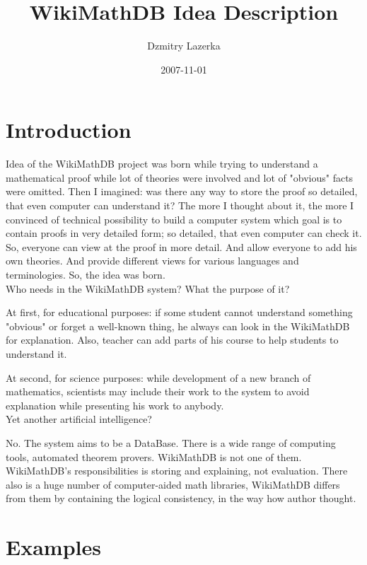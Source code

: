\documentclass{article}
\title {WikiMathDB Idea Description}
\author{Dzmitry Lazerka}
\date{2007-11-01}
\begin{document}
\maketitle

\section{Introduction}

Idea of the WikiMathDB project was born while trying to understand a
mathematical proof while lot of theories were involved and lot of
"obvious" facts were omitted. Then I imagined: was there any way to
store the proof so detailed, that even computer can understand it?
The more I thought about it, the more I convinced of technical
possibility to build a computer system which goal is to contain
proofs in very detailed form; so detailed, that even computer can
check it. So, everyone can view at the proof in more detail. And
allow everyone to add his own theories. And provide different views
for various languages and terminologies. So, the idea was born.\\

Who needs in the WikiMathDB system? What the purpose of it?

At first, for educational purposes: if some student cannot
understand something "obvious" or forget a well-known thing, he
always can look in the WikiMathDB for explanation. Also, teacher can
add parts of his course to help students to understand it.

At second, for science purposes: while development of a new branch
of mathematics, scientists may include their work to the system to
avoid explanation while presenting his work to anybody.\\

Yet another artificial intelligence?

No. The system aims to be a DataBase. There is a wide range of
computing tools, automated theorem provers. WikiMathDB is not one of
them. WikiMathDB's responsibilities is storing and explaining, not
evaluation. There also is a huge number of computer-aided math
libraries, WikiMathDB differs from them by containing the logical
consistency, in the way how author thought.

\newpage

\section{Examples}
\end{document}
